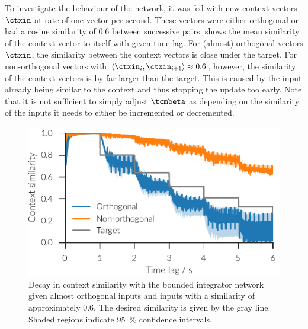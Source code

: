 To investigate the behaviour of the network, it was fed with new context vectors $\ctxin$ at rate of one vector per second.
These vectors were either orthogonal or had a cosine similarity of \num{0.6} between successive pairs.
 shows the mean similarity of the context vector to itself with given time lag.
For (almost) orthogonal vectors $\ctxin$, the similarity between the context vectors is close under the target.
For non-orthogonal vectors with $\langle\ctxin_i, \ctxin_{i+1}\rangle \approx 0.6$, however, the similarity of the context vectors is by far larger than the target.
This is caused by the input already being similar to the context and thus stopping the update too early.
Note that it is not sufficient to simply adjust $\tcmbeta$ as depending on the similarity of the inputs it needs to either be incremented or decremented.
\begin{figure}
    \centering
    \includegraphics{figures/context-analysis/bounded-integrator}
    \caption[Decay in context similarity with the bounded integrator network]{
        Decay in context similarity with the bounded integrator network given almost orthogonal inputs and inputs with a similarity of approximately \num{0.6}.
        The desired similarity is given by the gray line. Shaded regions indicate \SI{95}{\percent} confidence intervals.}\label{fig:bounded-integrator}
\end{figure}

